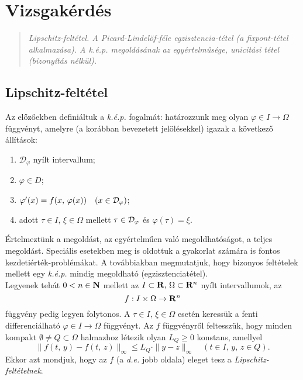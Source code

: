 \newpage
\section{Vizsgakérdés}
\begin{quote}
	\textit{Lipschitz-feltétel. A Picard-Lindelöf-féle egzisztencia-tétel (a fixpont-tétel alkalmazása). A k.é.p. megoldásának az egyértelműsége, unicitási tétel (bizonyítás nélkül).}
\end{quote}

\subsection{Lipschitz-feltétel}
Az előzőekben definiáltuk a \textit{k.é.p.} fogalmát: határozzunk meg olyan $\varphi \in I \to \Omega$ függvényt, amelyre (a korábban bevezetett jelölésekkel) igazak a következő állítások:
\begin{enumerate}
	\item $\mathcal{D}_\varphi$ nyílt intervallum;
	\item $\varphi \in D$;
	\item $\varphi'(x) = f(x, \, \varphi(x)) \quad (x \in \mathcal{D}_\varphi)$;
	\item adott $\tau \in I, \, \xi \in \Omega$ mellett $\tau \in \mathcal{D}_\varphi$ és $\varphi(\tau) = \xi$.
\end{enumerate}
Értelmeztünk a megoldást, az egyértelműen való megoldhatóságot, a teljes megoldást. Speciális esetekben meg is oldottuk a gyakorlat számára is fontos kezdetiérték-problémákat. A továbbiakban megmutatjuk, hogy bizonyos feltételek mellett egy \textit{k.é.p.} mindig megoldható (egzisztenciatétel).\\

Legyenek tehát $0 < n \in \mathbf{N}$ mellett az $I \subset \mathbf{R}, \, \Omega \subset \mathbf{R}^n$ nyílt intervallumok, az
\[
f : I \times \Omega \to \mathbf{R}^n
\]
függvény pedig legyen folytonos. A $\tau \in I, \, \xi \in \Omega$ esetén keressük a fenti differenciálható $\varphi \in I \to \Omega$ függvényt. Az $f$ függvényről feltesszük, hogy minden kompakt $\emptyset \neq Q \subset \Omega$ halmazhoz létezik olyan $L_Q \geq 0$ konstans, amellyel
\[
\| f(t, \, y) - f(t, \, z) \|_\infty \leq L_Q \cdot \| y - z \|_\infty \quad (t \in I, \, y, \, z \in Q).
\]
Ekkor azt mondjuk, hogy az $f$ (a \textit{d.e.} jobb oldala) eleget tesz a \textit{Lipschitz-feltételnek}.

